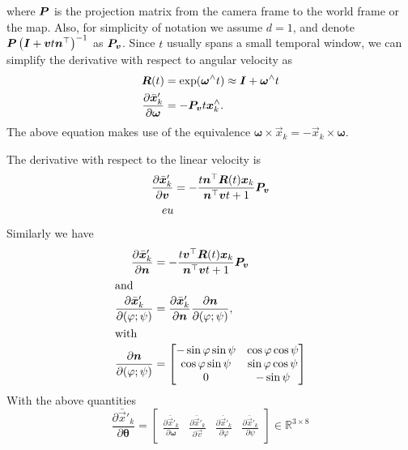 where $\mat{P}$ is the projection matrix from the camera frame to the
world frame or the map. Also, for simplicity of notation we assume
$d = 1$, and denote
$\mat{P}\left(\mat{I}+\vec{v}t\vec{n}^\top\right)^{-1}$ as
$\mat{P_v}$. Since $t$ usually spans a small temporal window, we can
simplify the derivative with respect to angular velocity as
\begin{align}
  \mat{R}(t)& =\mathrm{exp}(\bm{\omega}^\wedge t)\approx\mat{I}+\bm{\omega}^\wedge t\\
  \frac{\partial\bar{\vec{x}}'_k}{\partial\bm{\omega}}&=-\mat{P_v}t\vec{x}_k^\wedge.  \label{eq:dxdo}
\end{align}
The above equation makes use of the equivalence
$\bm{\omega}\times\vec{x}_k=-\vec{x}_k\times\bm{\omega}$.

The derivative with respect to the linear velocity is
\begin{align}
  \frac{\partial\bar{\vec{x}}'_k}{\partial\vec{v}}&=-\frac{t\vec{n}^\top\mat{R}(t)\vec{x}_k}{\vec{n}^\top\vec{v}t+1}\mat{P_v} \label{eq:dxdv}\\
  eu
\end{align}
Similarly we have
\begin{align}
  \frac{\partial\bar{\vec{x}}'_k}{\partial\vec{n}}&=-\frac{t\vec{v}^\top\mat{R}(t)\vec{x}_k}{\vec{n}^\top\vec{v}t+1}\mat{P_v} \\
  \intertext{and}
  \frac{\partial\bar{\vec{x}}'_k}{\partial(\varphi;\psi)}&= \frac{\partial\bar{\vec{x}}'_k}{\partial\vec{n}}\frac{\partial\vec{n}}{\partial(\varphi;\psi)},\\
  \intertext{with}
  \frac{\partial\vec{n}}{\partial(\varphi;\psi)}&=
                                                  \begin{bmatrix}
                                                    -\sin\varphi\sin\psi&\cos\varphi\cos\psi\\
                                                    \cos\varphi\sin\psi&\sin\varphi\cos\psi\\
                                                    0&-\sin\psi
                                                  \end{bmatrix}
                                                       \label{eq:dvdn}
\end{align}
With the above quantities
\begin{equation*}
  \label{eq:dx_dtheta}
  \frac{\partial\bar{\vec{x}}'_k}{\partial\bm{\theta}}=
  \begin{bmatrix}
    \frac{\partial\bar{\vec{x}}'_k}{\partial\bm{\omega}}&
    \frac{\partial\bar{\vec{x}}'_k}{\partial\vec{v}}&
    \frac{\partial\bar{\vec{x}}'_k}{\partial\varphi}&\frac{\partial\bar{\vec{x}}'_k}{\partial\psi}
  \end{bmatrix}\in\mathbb{R}^{3\times8}
\end{equation*}
